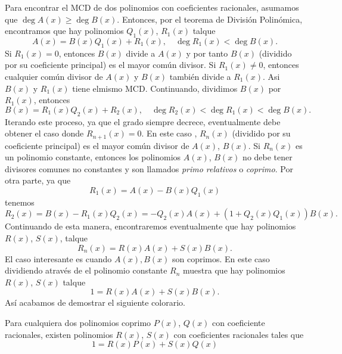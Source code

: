 Para encontrar el MCD de dos polinomios con coeficientes racionales, asumamos que $\deg{A(x)} \geq \deg{B(x)}$.
Entonces, por el teorema de División Polinómica, encontramos que hay polinomios $Q_1(x)$, $R_1(x)$ talque
\[
    A(x) = B(x) Q_1(x) + R_1(x),\quad \deg{R_1(x)} < \deg{B(x)}.
\]
Si $R_1(x) = 0$, entonces $B(x)$ divide a $A(x)$ y por tanto $B(x)$ (dividido por su coeficiente principal) es el mayor común divisor.
Si $R_1(x) \neq 0$, entonces cualquier común divisor de $A(x)$ y $B(x)$ también divide a $R_1(x)$.
Asi $B(x)$ y $R_1(x)$ tiene elmismo MCD.
Continuando, dividimos $B(x)$ por $R_1(x)$, entonces
\[
    B(x) = R_1(x) Q_2(x) + R_2(x), \quad \deg{R_2(x)} < \deg{R_1(x)} < \deg{B(x)}.
\]
Iterando este proceso, ya que el grado siempre decrece, eventualmente debe obtener el caso donde $R_{n + 1}(x) = 0$.
En este caso , $R_n(x)$ (dividido por su coeficiente principal) es el mayor común divisor de $A(x)$, $B(x)$.
Si $R_n (x)$ es un polinomio constante, entonces los polinomios $A(x)$, $B(x)$ no debe tener divisores comunes no constantes y son llamados \textit{primo relativos} o \textit{coprimo}.
Por otra parte, ya que
\[
    R_1(x) = A(x) - B(x) Q_1(x)
\]
tenemos
\[
    R_2 (x) = B(x) - R_1(x) Q_2(x) = - Q_2(x) A(x) + \left(1 + Q_2(x) Q_1(x)\right) B(x).
\]
Continuando de esta manera, encontraremos eventualmente que hay polinomios $R(x)$, $S(x)$, talque
\[
    R_n(x) = R(x) A(x) + S(x) B(x).
\]
El caso interesante es cuando $A(x), B(x)$ son coprimos.
En este caso dividiendo através de el polinomio constante $R_n$ muestra que hay polinomios $R(x)$, $S(x)$ talque
\[
    1 = R(x) A(x) + S(x) B(x).
\]
Así acabamos de demostrar el siguiente colorario.

\begin{corollary}
    Para cualquiera dos polinomios coprimo $P(x)$, $Q(x)$ con coeficiente racionales,
    existen polinomios $R(x)$, $S(x)$ con coeficientes racionales tales que
    \[
        1 = R(x) P(x) + S(x) Q(x)
    \]
\end{corollary}

